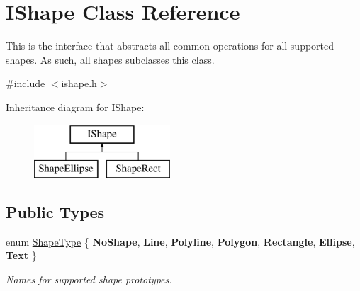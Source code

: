 \hypertarget{class_i_shape}{}\section{I\+Shape Class Reference}
\label{class_i_shape}


This is the interface that abstracts all common operations for all supported shapes. As such, all shapes subclasses this class.  




{\ttfamily \#include $<$ishape.\+h$>$}

Inheritance diagram for I\+Shape\+:\begin{figure}[H]
\begin{center}
\leavevmode
\includegraphics[height=2.000000cm]{class_i_shape}
\end{center}
\end{figure}
\subsection*{Public Types}
\begin{DoxyCompactItemize}
\item 
enum \mbox{\hyperlink{class_i_shape_a8f50993477b5ddb44c0547ef3d547cdc}{Shape\+Type}} \{ \newline
{\bfseries No\+Shape}, 
{\bfseries Line}, 
{\bfseries Polyline}, 
{\bfseries Polygon}, 
\newline
{\bfseries Rectangle}, 
{\bfseries Ellipse}, 
{\bfseries Text}
 \}
\begin{DoxyCompactList}\small\item\em Names for supported shape prototypes. \end{DoxyCompactList}\end{DoxyCompactItemize}
